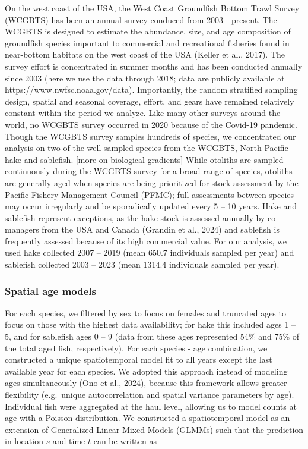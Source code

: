 \documentclass[
]{article}
\begin{document}
On the west coast of the USA, the West Coast Groundfish Bottom Trawl
Survey (WCGBTS) has been an annual survey conduced from 2003 - present.
The WCGBTS is designed to estimate the abundance, size, and age
composition of groundfish species important to commercial and
recreational fisheries found in near-bottom habitats on the west coast
of the USA (Keller et al., 2017). The survey effort is concentrated in
summer months and has been conducted annually since 2003 (here we use
the data through 2018; data are publicly available at
https://www.nwfsc.noaa.gov/data). Importantly, the random stratified
sampling design, spatial and seasonal coverage, effort, and gears have
remained relatively constant within the period we analyze. Like many
other surveys around the world, no WCGBTS survey occurred in 2020
because of the Covid-19 pandemic. Though the WCGBTS survey samples
hundreds of species, we concentrated our analysis on two of the well
sampled species from the WCGBTS, North Pacific hake and sablefish.
{[}more on biological gradients{]} While otoliths are sampled
continuously during the WCGBTS survey for a broad range of species,
otoliths are generally aged when species are being prioritized for stock
assessment by the Pacific Fishery Management Council (PFMC); full
assessments between species may occur irregularly and be sporadically
updated every 5 -- 10 years. Hake and sablefish represent exceptions, as
the hake stock is assessed annually by co-managers from the USA and
Canada (Grandin et al., 2024) and sablefish is frequently assessed
because of its high commercial value. For our analysis, we used hake
collected 2007 -- 2019 (mean 650.7 individuals sampled per year) and
sablefish collected 2003 -- 2023 (mean 1314.4 individuals sampled per
year).

\subsubsection{Spatial age models}\label{spatial-age-models}

For each species, we filtered by sex to focus on females and truncated
ages to focus on those with the highest data availability; for hake this
included ages 1 -- 5, and for sablefish ages 0 -- 9 (data from these
ages represented 54\% and 75\% of the total aged fish, respectively).
For each species - age combination, we constructed a unique
spatiotemporal model fit to all years except the last available year for
each species. We adopted this approach instead of modeling ages
simultaneously (Ono et al., 2024), because this framework allows greater
flexibility (e.g.~unique autocorrelation and spatial variance parameters
by age). Individual fish were aggregated at the haul level, allowing us
to model counts at age with a Poisson distribution. We constructed a
spatiotemporal model as an extension of Generalized Linear Mixed Models
(GLMMs) such that the prediction in location \(s\) and time \(t\) can be
written as
\end{document}
